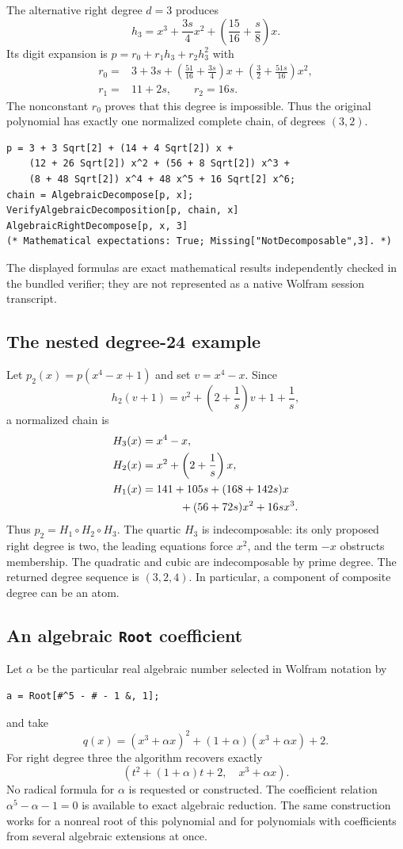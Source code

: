 \documentclass[11pt,a4paper]{article}
\numberwithin{equation}{section}
\theoremstyle{definition}
\theoremstyle{remark}
\newcommand{\code}[1]{\texttt{#1}}
\begin{document}
The alternative right degree $d=3$ produces
\[
 h_3=x^3+\frac{3s}{4}x^2+\left(\frac{15}{16}+\frac{s}{8}\right)x.
\]
Its digit expansion is $p=r_0+r_1h_3+r_2h_3^2$ with
\begin{align*}
 r_0={}&3+3s+\left(\frac{51}{16}+\frac{3s}{4}\right)x
                +\left(\frac32+\frac{51s}{16}\right)x^2,\\
 r_1={}&11+2s,\qquad r_2=16s.
\end{align*}
The nonconstant $r_0$ proves that this degree is impossible. Thus the original
polynomial has exactly one normalized complete chain, of degrees $(3,2)$.

\begin{lstlisting}
p = 3 + 3 Sqrt[2] + (14 + 4 Sqrt[2]) x +
    (12 + 26 Sqrt[2]) x^2 + (56 + 8 Sqrt[2]) x^3 +
    (8 + 48 Sqrt[2]) x^4 + 48 x^5 + 16 Sqrt[2] x^6;
chain = AlgebraicDecompose[p, x];
VerifyAlgebraicDecomposition[p, chain, x]
AlgebraicRightDecompose[p, x, 3]
(* Mathematical expectations: True; Missing["NotDecomposable",3]. *)
\end{lstlisting}
The displayed formulas are exact mathematical results independently checked
in the bundled verifier; they are not represented as a native Wolfram session
transcript.

\subsection{The nested degree-24 example}
Let $p_2(x)=p(x^4-x+1)$ and set $v=x^4-x$. Since
\[
 h_2(v+1)=v^2+\left(2+\frac1s\right)v+1+\frac1s,
\]
a normalized chain is
\begin{align*}
 H_3(x)&=x^4-x,\\
 H_2(x)&=x^2+\left(2+\frac1s\right)x,\\
 H_1(x)&=141+105s+(168+142s)x\\
       &\hspace{12mm}+(56+72s)x^2+16s x^3.
\end{align*}
Thus $p_2=H_1\circ H_2\circ H_3$. The quartic $H_3$ is indecomposable: its
only proposed right degree is two, the leading equations force $x^2$, and
the term $-x$ obstructs membership. The quadratic and cubic are
indecomposable by prime degree. The returned degree sequence is $(3,2,4)$.
In particular, a component of composite degree can be an atom.

\subsection{An algebraic \code{Root} coefficient}
Let $\alpha$ be the particular real algebraic number selected in Wolfram
notation by
\begin{lstlisting}
a = Root[#^5 - # - 1 &, 1];
\end{lstlisting}
and take
\[
 q(x)=(x^3+\alpha x)^2+(1+\alpha)(x^3+\alpha x)+2.
\]
For right degree three the algorithm recovers exactly
\[
 (t^2+(1+\alpha)t+2,\quad x^3+\alpha x).
\]
No radical formula for $\alpha$ is requested or constructed. The coefficient
relation $\alpha^5-\alpha-1=0$ is available to exact algebraic reduction.
The same construction works for a nonreal root of this polynomial and for
polynomials with coefficients from several algebraic extensions at once.
\end{document}
